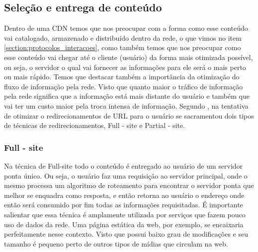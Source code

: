 \subsection{Sele\c{c}\~ao e entrega de conte\'udo}
Dentro de uma CDN temos que  nos preocupar com a forma como esse conte\'udo vai catalogado, armazenado e distribu\'ido dentro da rede, o que vimos no item \ref{section:protocolos_interacoes}, como tamb\'em temos que nos preocupar como esse conte\'udo vai chegar at\'e o cliente (usu\'ario) da forma mais otimizada poss\'ivel, ou seja, o servidor o qual vai fornecer as informa\c{c}\~oes para ele ser\'a o mais perto ou mais r\'apido. 
\newline Temos que destacar tamb\'em a import\^ancia da otimiza\c{c}\~ao do fluxo de informa\c{c}\~ao pela rede. Visto que quanto maior o tr\'afico de informa\c{c}\~ao pela rede significa que a informa\c{c}\~ao est\'a mais distante do usu\'ario e tamb\'em que vai ter um custo maior pela troca intensa de informa\c{c}\~ao. 
\newline Segundo \cite{krishnamurthy2001use}, na tentativa de otimizar o redirecionamentos de URL para o usu\'ario se sacramentou dois tipos de t\'ecnicas de redirecionamentos, Full - site e Partial - site.

\subsubsection{Full - site}
Na t\'ecnica de Full-site todo o conte\'udo \'e entregado ao usu\'ario de um servidor ponta \'unico. Ou seja, o usu\'ario faz uma requisi\c{c}\~ao ao servidor principal, onde o mesmo processa um algoritmo de roteamento para encontrar o servidor ponta que melhor se enquadra como resposta, e ent\~ao retorna ao usu\'ario o endere\c{c}o onde ent\~ao ser\'a consumido por fim todas as informa\c{c}\~oes requisitadas. 
\newline \'E importante salientar que essa t\'ecnica \'e amplamente utilizada por servi\c{c}os que fazem pouco uso de dados da rede. Uma p\'agina est\'atica da web, por exemplo, se encaixaria perfeitamente nesse contexto. Visto que possui baixo grau de modifica\c{c}\~oes e seu tamanho \'e pequeno perto de outros tipos de m\'idias que circulam na web.

